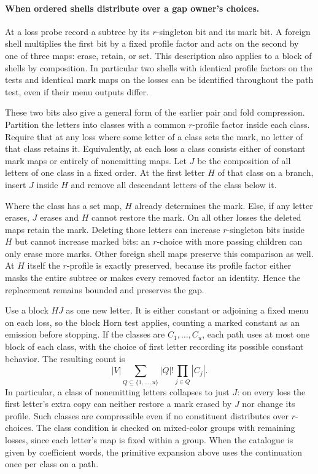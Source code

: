 \paragraph{When ordered shells distribute over a gap owner's choices.}
At a loss probe record a subtree by its $r$-singleton
bit and its mark bit. A foreign shell multiplies the
first bit by a fixed profile factor and acts on the
second by one of three maps: erase, retain, or set.
This description also applies to a block of shells by
composition. In particular two shells with identical
profile factors on the tests and identical mark maps
on the losses can be identified throughout the path
test, even if their menu outputs differ.

These two bits also give a general form of the earlier
pair and fold compression. Partition the letters into
classes with a common $r$-profile factor inside each
class. Require that at any loss where some letter of
a class sets the mark, no letter of that class retains
it. Equivalently, at each loss a class consists either
of constant mark maps or entirely of nonemitting maps.
Let $J$ be the composition of all letters of one class
in a fixed order. At the first letter $H$ of that class
on a branch, insert $J$ inside $H$ and remove all
descendant letters of the class below it.

Where the class has a set map, $H$ already determines
the mark. Else, if any letter erases, $J$ erases and
$H$ cannot restore the mark. On all other losses the
deleted maps retain the mark. Deleting those letters
can increase $r$-singleton bits inside $H$ but cannot
increase marked bits: an $r$-choice with more passing
children can only erase more marks. Other foreign
shell maps preserve this comparison as well. At $H$
itself the $r$-profile is exactly preserved, because
its profile factor either masks the entire subtree or
makes every removed factor an identity. Hence the
replacement remains bounded and preserves the gap.

Use a block $HJ$ as one new letter. It is either
constant or adjoining a fixed menu on each loss, so
the block Horn test applies, counting a marked constant
as an emission before stopping. If the classes are
$C_1,\ldots,C_u$, each path uses at most one block of
each class, with the choice of first letter recording
its possible constant behavior. The resulting count is
\[
           |V|\sum_{Q\subseteq\{1,\ldots,u\}}
                           |Q|!\prod_{j\in Q}|C_j|.
\]
In particular, a class of nonemitting letters collapses
to just $J$: on every loss the first letter's extra
copy can neither restore a mark erased by $J$ nor
change its profile. Such classes are compressible
even if no constituent distributes over $r$-choices.
The class condition is checked on mixed-color groups
with remaining losses, since each letter's map is
fixed within a group.
When the catalogue is given by coefficient words, the
primitive expansion above uses the continuation once
per class on a path.

